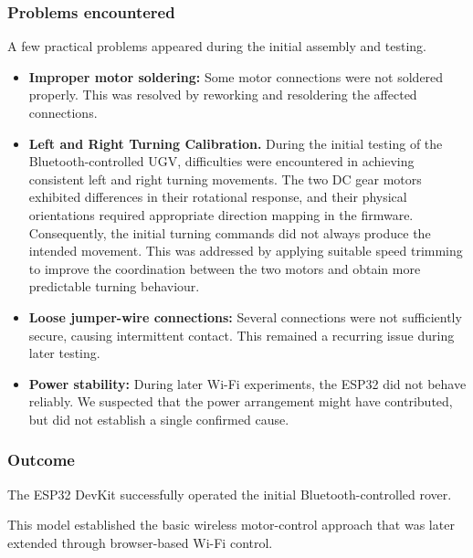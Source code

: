 \documentclass[11pt,a4paper]{article}
\begin{document}
\subsubsection{Problems encountered}

A few practical problems appeared during the initial
assembly and testing.

\begin{itemize}

    \item \textbf{Improper motor soldering:}
    Some motor connections were not soldered properly.
    This was resolved by reworking and resoldering
    the affected connections.

    \item \textbf{Left and Right Turning Calibration.}
	During the initial testing of the Bluetooth-controlled UGV, difficulties were encountered 
	in achieving consistent left and right turning movements. The two DC gear motors exhibited 
	differences in their rotational response, and their physical orientations required appropriate 
	direction mapping in the firmware. Consequently, the initial turning commands did not always 
	produce the intended movement. This was addressed by applying suitable speed trimming to 
	improve the coordination between the two motors and obtain more predictable turning behaviour.

    \item \textbf{Loose jumper-wire connections:}
    Several connections were not sufficiently secure,
    causing intermittent contact. This remained a
    recurring issue during later testing.

    \item \textbf{Power stability:}
    During later Wi-Fi experiments, the ESP32 did not
    behave reliably. We suspected that the power
    arrangement might have contributed, but did not
    establish a single confirmed cause.

\end{itemize}


\subsubsection{Outcome}

The ESP32 DevKit successfully operated the initial
Bluetooth-controlled rover.

This model established the basic wireless motor-control
approach that was later extended through browser-based
Wi-Fi control.
\end{document}
